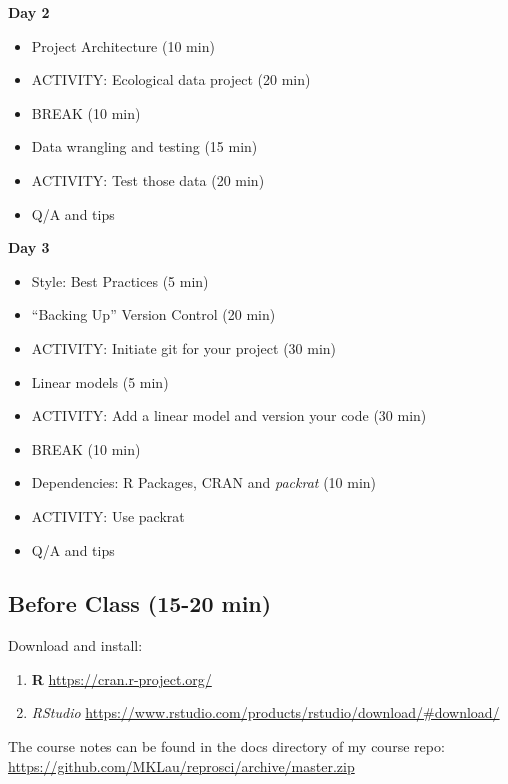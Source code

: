 \documentclass[11pt,]{article}
\providecommand{\tightlist}{%
  \setlength{\itemsep}{0pt}\setlength{\parskip}{0pt}}
\begin{document}
\textbf{Day 2}

\begin{itemize}
\tightlist
\item
  Project Architecture (10 min)
\item
  ACTIVITY: Ecological data project (20 min)
\item
  BREAK (10 min)
\item
  Data wrangling and testing (15 min)
\item
  ACTIVITY: Test those data (20 min)
\item
  Q/A and tips
\end{itemize}

\textbf{Day 3}

\begin{itemize}
\tightlist
\item
  Style: Best Practices (5 min)
\item
  ``Backing Up'' Version Control (20 min)
\item
  ACTIVITY: Initiate git for your project (30 min)
\item
  Linear models (5 min)
\item
  ACTIVITY: Add a linear model and version your code (30 min)
\item
  BREAK (10 min)
\item
  Dependencies: R Packages, CRAN and \emph{packrat} (10 min)
\item
  ACTIVITY: Use packrat
\item
  Q/A and tips
\end{itemize}

\hypertarget{before-class-15-20-min}{%
\subsection{Before Class (15-20 min)}\label{before-class-15-20-min}}

Download and install:

\begin{enumerate}
\def\labelenumi{\arabic{enumi}.}
\tightlist
\item
  \textbf{R} \url{https://cran.r-project.org/}
\item
  \emph{RStudio}
  \url{https://www.rstudio.com/products/rstudio/download/\#download/}
\end{enumerate}

The course notes can be found in the docs directory of my course repo:
\url{https://github.com/MKLau/reprosci/archive/master.zip}
\end{document}
